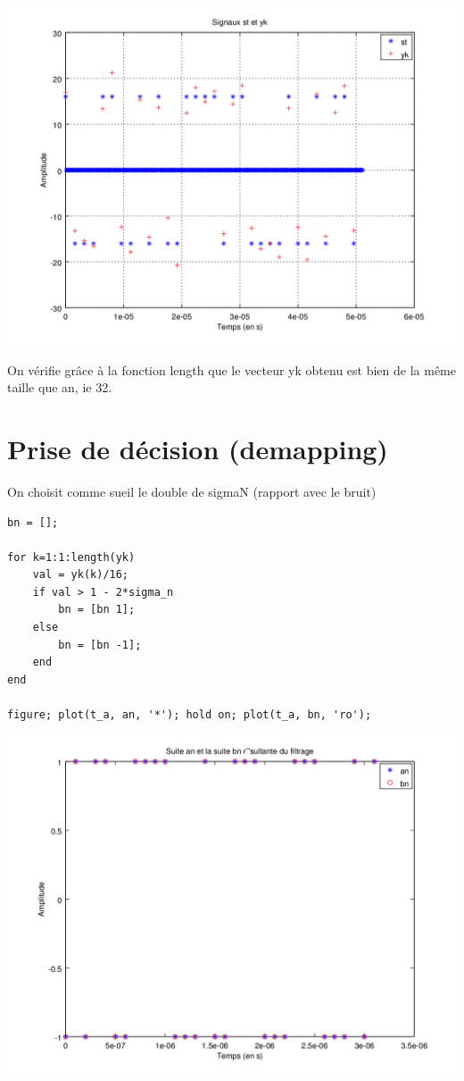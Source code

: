 \documentclass{acm_proc_article-sp}
\begin{document}
\begin{center}
\includegraphics[scale=0.45]{yk_13.png}
\end{center}

On vérifie grâce à la fonction length que le vecteur yk obtenu est bien de la même taille que an, ie 32.


\section{Prise de décision (demapping)}

On choisit comme sueil le double de sigmaN (rapport avec le bruit)

\begin{lstlisting}
bn = [];

for k=1:1:length(yk)
    val = yk(k)/16;
    if val > 1 - 2*sigma_n
        bn = [bn 1];
    else
        bn = [bn -1];
    end
end

figure; plot(t_a, an, '*'); hold on; plot(t_a, bn, 'ro');
\end{lstlisting}

\begin{center}
\includegraphics[scale=0.45]{an_bn_14.png}
\end{center}
\end{document}
